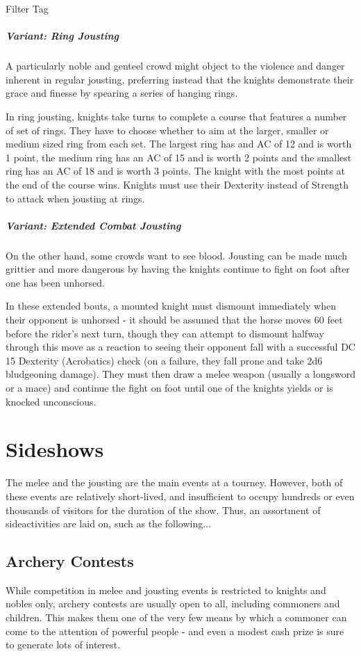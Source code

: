 \documentclass[10pt,a4paper,twoside,bg=print,twocolumn,openany,nodeprecatedcode]{dndbook}
\begin{document}
\begin{DndSidebar}[float=!b]{Filter Tag}
\subparagraph{Variant: Ring Jousting}
A particularly noble and genteel crowd might object to the violence and danger inherent in regular jousting, preferring instead that the knights demonstrate their grace and finesse by spearing a series of hanging rings.

In ring jousting, knights take turns to complete a course that features a number of set of rings. They have to choose whether to aim at the larger, smaller or medium sized ring from each set. The largest ring has and AC of 12 and is worth 1 point, the medium ring has an AC of 15 and is worth 2 points and the smallest ring has an AC of 18 and is worth 3 points. The knight with the most points at the end of the course wins. Knights must use their Dexterity instead of Strength to attack when jousting at rings.



\subparagraph{Variant: Extended Combat Jousting}
On the other hand, some crowds want to see blood. Jousting can be made much grittier and more dangerous by having the knights continue to fight on foot after one has been unhorsed.

In these extended bouts, a mounted knight must dismount immediately when their opponent is unhorsed - it should be assumed that the horse moves 60 feet before the rider's next turn, though they can attempt to dismount halfway through this move as a reaction to seeing their opponent fall with a successful DC 15 Dexterity (Acrobatics) check (on a failure, they fall prone and take 2d6 bludgeoning damage). They must then draw a melee weapon (usually a longsword or a mace) and continue the fight on foot until one of the knights yields or is knocked unconscious.



\end{DndSidebar}

\section{Sideshows}
The melee and the jousting are the main events at a tourney. However, both of these events are relatively short-lived, and insufficient to occupy hundreds or even thousands of visitors for the duration of the show. Thus, an assortment of sideactivities are laid on, such as the following...

\subsection{Archery Contests}
While competition in melee and jousting events is restricted to knights and nobles only, archery contests are usually open to all, including commoners and children. This makes them one of the very few means by which a commoner can come to the attention of powerful people - and even a modest cash prize is sure to generate lots of interest.
\end{document}
